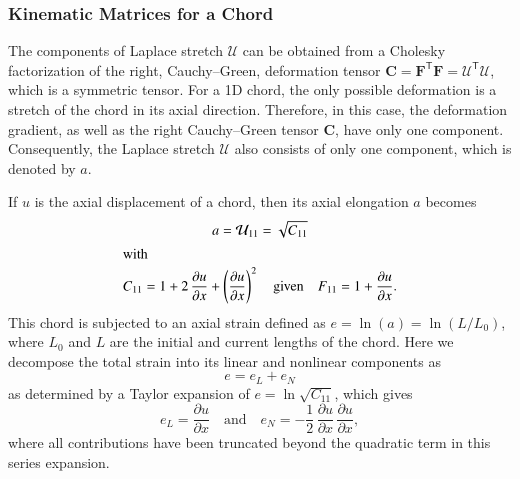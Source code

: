 \subsubsection{Kinematic Matrices for a Chord}

The components of Laplace stretch $\boldsymbol{\mathcal{U}}$ can be obtained from a Cholesky factorization of the right, Cauchy--Green, deformation tensor $\mathbf{C} = \mathbf{F}^{\mathsf{T}} \mathbf{F} = \boldsymbol{\mathcal{U}}^{\mathsf{T}} \boldsymbol{\mathcal{U}}$, \cite{Srinivasa12} which is a symmetric tensor. For a 1D chord, the only possible deformation is a stretch of the chord in its axial direction. Therefore, in this case, the deformation gradient, as well as the right Cauchy--Green tensor $\mathbf{C}$, have only one component.  Consequently, the Laplace stretch $\boldsymbol{\mathcal{U}}$ also consists of only one component, which is denoted by $a$. 

If $u$ is the axial displacement of a chord, then its axial elongation $a$ becomes
\begin{subequations}
    \begin{gather}
    a = {\mathcal{U}}_{11} = \sqrt{C_{11}} \\
    \intertext{with} 
   {C_{11}} = 1 + 2 \, \frac{{\partial u}}{\partial x} + \left(\frac{{\partial u}}{\partial x}\right)^2 
    \quad \text{given} \quad 
    F_{11} = 1 + \frac{{\partial u}}{\partial x} .
    \end{gather}
\end{subequations} 
This chord is subjected to an axial strain defined as $e = \ln ( a ) = \ln ( L / L_0 )$, where $L_0$ and $L$ are the initial and current lengths of the chord.  Here we decompose the total strain into its linear and nonlinear components as
\begin{equation}
e = e_{L} + e_{N}
\end{equation} 
as determined by a Taylor expansion of $e = \ln \sqrt{C_{11}}$, which gives
\begin{equation}
    e_{L} = {\frac{\partial u}{\partial x}} 
    \quad \text{and} \quad
    e_{N} = -\frac{1}{2} \, {\frac{\partial u}{\partial x}}\, {\frac{\partial u}{\partial x}} ,
\end{equation}
where all contributions have been truncated beyond the quadratic term in this series expansion.

